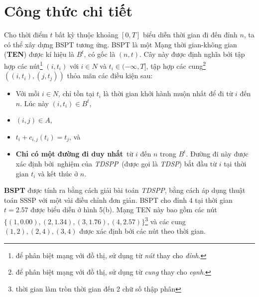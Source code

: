 \documentclass[../main.tex]{subfiles}
\begin{document}
\section{Công thức chi tiết}\label{cong-thuc1}

Cho thời điểm \(t\) bất kỳ thuộc khoảng \([0, T]\) biểu diễn thời gian
đi đến đỉnh \(n\), ta có thể xây dựng BSPT tương ứng. BSPT là một Mạng
thời gian-không gian (\textbf{TEN}) được kí hiệu là \(B^t\), có gốc là
\((n, t)\). Cây này được định nghĩa bởi tập hợp các nút\footnote{để phân
  biệt mạng với đồ thị, sử dụng từ \emph{nút} thay cho \emph{đỉnh}.} \((i, t_i)\)
với \(i \in N\) và \(t_i \in (-\infty, T]\), tập hợp các cung\footnote{để
  phân biệt mạng với đồ thị, sử dụng từ \emph{cung} thay cho \emph{cạnh}.}
\(((i, t_i), (j, t_j))\) thỏa mãn các điều kiện sau: 

\begin{itemize}
\tightlist
\item
  Với mỗi \(i\in N\), chỉ tồn tại \(t_i\) là thời gian khởi hành muộn
  nhất để đi từ \(i\) đến \(n\). Lúc này \((i, t_i)\in B^t\),
\item
  \((i, j) \in A\),
\item
  \(t_i + c_{i, j}(t_i) = t_j\), và
\item
  \textbf{Chỉ có một đường đi duy nhất}~từ \(i\) đến \(n\) trong
  \(B^t\). Đường đi này được xác định bởi~nghiệm của \emph{TDSPP}~(được
  gọi là \emph{TDSP}) bắt đầu từ \(i\) tại thời gian \(t_i\) và kết thúc
  ở \(n\).
\end{itemize}

\textbf{BSPT} được tính ra
bằng cách giải bài toán \emph{TDSPP}, bằng cách áp dụng thuật toán SSSP
với một vài điều chỉnh đơn giản. BSPT cho đỉnh \(4\) tại thời gian
\(t=2.57\) được biểu diễn ở hình 5(b). Mạng TEN này bao gồm các nút
\(\{(1, 0.00), (2, 1.34), (3, 1.76), (4, 2.57)\}\)\footnote{thời gian
  làm tròn thời gian đến 2 chữ số thập phân} và các cung
\((1, 2), (2, 4), (3, 4)\) được xác định bởi các nút theo thời gian.
\end{document}
